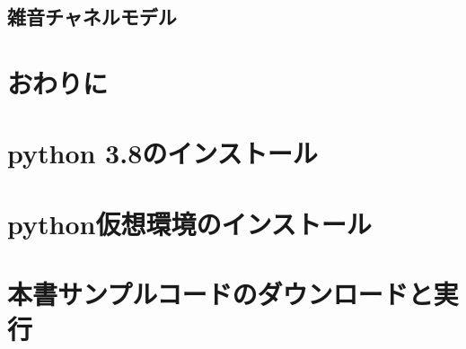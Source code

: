 \documentclass[11pt]{report}
\begin{document}
\section{雑音チャネルモデル}

\chapter{おわりに}

\appendix
\def\thesection{補遺\Alph{section}}

\chapter{python 3.8のインストール}

\chapter{python仮想環境のインストール}

\chapter{本書サンプルコードのダウンロードと実行}
\end{document}

